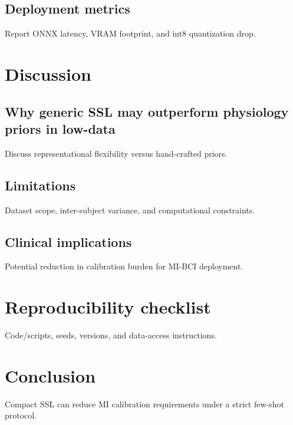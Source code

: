 \documentclass[11pt]{article}
\begin{document}
\subsection{Deployment metrics}
Report ONNX latency, VRAM footprint, and int8 quantization drop.

\section{Discussion}
\subsection{Why generic SSL may outperform physiology priors in low-data}
Discuss representational flexibility versus hand-crafted priors.
\subsection{Limitations}
Dataset scope, inter-subject variance, and computational constraints.
\subsection{Clinical implications}
Potential reduction in calibration burden for MI-BCI deployment.

\section{Reproducibility checklist}
Code/scripts, seeds, versions, and data-access instructions.

\section{Conclusion}
Compact SSL can reduce MI calibration requirements under a strict few-shot protocol.



\end{document}
